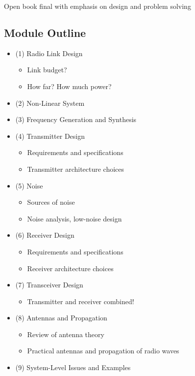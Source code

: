 \documentclass[12pt]{article}
\begin{document}
Open book final with emphasis on design and problem solving

\subsection{Module Outline}

\begin{itemize}[noitemsep]
    \item (1) Radio Link Design
    \begin{itemize}[noitemsep]
        \item Link budget?
        \item How far? How much power?
    \end{itemize}
    \item (2) Non-Linear System
    \item (3) Frequency Generation and Synthesis
    \item (4) Transmitter Design
    \begin{itemize}[noitemsep]
        \item Requirements and specifications
        \item Transmitter architecture choices
    \end{itemize}
    \item (5) Noise
    \begin{itemize}[noitemsep]
        \item Sources of noise
        \item Noise analysis, low-noise design
    \end{itemize}
    \item (6) Receiver Design
    \begin{itemize}[noitemsep]
        \item Requirements and specifications
        \item Receiver architecture choices
    \end{itemize}
    \item (7) Transceiver Design
    \begin{itemize}[noitemsep]
        \item Transmitter and receiver combined!
    \end{itemize}
    \item (8) Antennas and Propagation
    \begin{itemize}[noitemsep]
        \item Review of antenna theory
        \item Practical antennas and propagation of radio waves
    \end{itemize}
    \item (9) System-Level Issues and Examples
\end{itemize}
\end{document}
